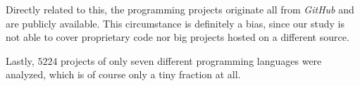 Directly related to this, the programming projects originate all from \textit{GitHub} and are publicly available. This circumstance is definitely a bias, since our study is not able to cover proprietary code nor big projects hosted on a different source.

Lastly, $5224$ projects of only seven different programming languages were analyzed, which is of course only a tiny fraction at all.
 
